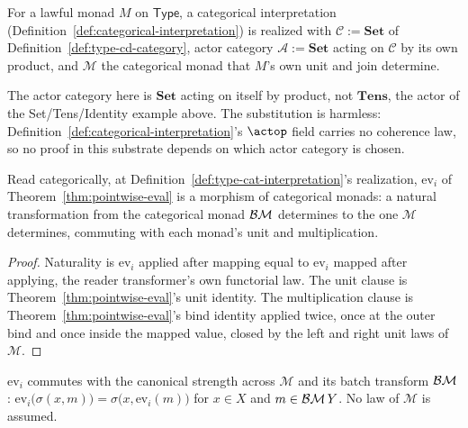 \begin{definition}
\label{def:type-cat-interpretation}
\leanok
For a lawful monad $M$ on $\mathsf{Type}$, a categorical interpretation
(Definition~\ref{def:categorical-interpretation}) is realized with
$\mathcal C := \mathbf{Set}$ of Definition~\ref{def:type-cd-category},
actor category $\mathcal A := \mathbf{Set}$ acting on $\mathcal C$ by
its own product, and $\mathcal M$ the categorical monad that $M$'s own
unit and join determine.
\end{definition}

The actor category here is $\mathbf{Set}$ acting on itself by product,
not $\mathbf{Tens}$, the actor of the Set/Tens/Identity example above.
The substitution is harmless: Definition~\ref{def:categorical-interpretation}'s
$\actop$ field carries no coherence law, so no proof in this substrate
depends on which actor category is chosen.

\begin{definition}
\label{def:ev-monad-hom}
\leanok
Read categorically, at Definition~\ref{def:type-cat-interpretation}'s
realization, $\mathrm{ev}_i$ of Theorem~\ref{thm:pointwise-eval} is a
morphism of categorical monads: a natural transformation from the
categorical monad $\mathcal B\mathcal M$ determines to the one $\mathcal M$
determines, commuting with each monad's unit and multiplication.
\end{definition}

\begin{proof}
\leanok
Naturality is $\mathrm{ev}_i$ applied after mapping equal to
$\mathrm{ev}_i$ mapped after applying, the reader transformer's own
functorial law. The unit clause is Theorem~\ref{thm:pointwise-eval}'s
unit identity. The multiplication clause is
Theorem~\ref{thm:pointwise-eval}'s bind identity applied twice, once
at the outer bind and once inside the mapped value, closed by the left
and right unit laws of $\mathcal M$.
\end{proof}

\begin{lemma}
\label{lem:ev-strength-natural}
\leanok
$\mathrm{ev}_i$ commutes with the canonical strength across
$\mathcal M$ and its batch transform $\mathcal B\mathcal M$:
$\mathrm{ev}_i\bigl(\sigma(x, m)\bigr) = \sigma\bigl(x, \mathrm{ev}_i(m)\bigr)$
for $x \in X$ and $m \in \mathcal B\mathcal M\, Y$. No law of $\mathcal M$
is assumed.
\end{lemma}

